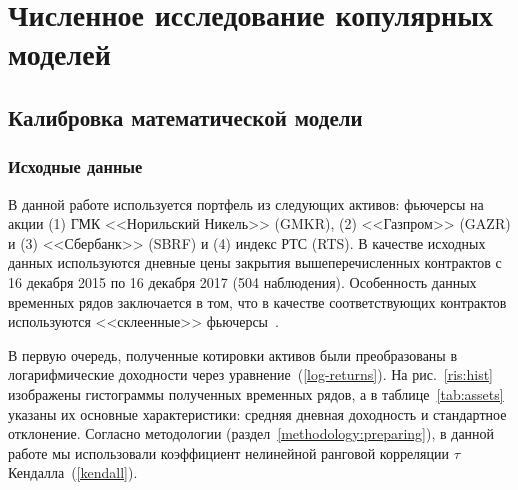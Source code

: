 \section{Численное исследование копулярных моделей}
\label{section:results}

\subsection{Калибровка математической модели}


\subsubsection{Исходные данные}

В данной работе используется портфель из следующих активов: фьючерсы на акции (1) ГМК <<Норильский Никель>> (GMKR), (2) <<Газпром>> (GAZR) и (3) <<Сбербанк>> (SBRF) и (4) индекс РТС (RTS). 
В качестве исходных данных используются дневные цены закрытия вышеперечисленных контрактов с 16 декабря 2015 по 16 декабря 2017 (504 наблюдения). %
Особенность данных временных рядов заключается в том, что в качестве соответствующих контрактов используются <<склеенные>> фьючерсы~\cite{Masteika2012}.

В первую очередь, полученные котировки активов были преобразованы в логарифмические доходности через уравнение~(\ref{log-returns}).
На рис.~\ref{ris:hist} изображены гистограммы полученных временных рядов, а в таблице~\ref{tab:assets} указаны их основные характеристики: средняя дневная доходность и стандартное отклонение. Согласно методологии (раздел~\ref{methodology:preparing}), в данной работе мы использовали коэффициент нелинейной ранговой корреляции $\tau$ Кендалла~(\ref{kendall}).

